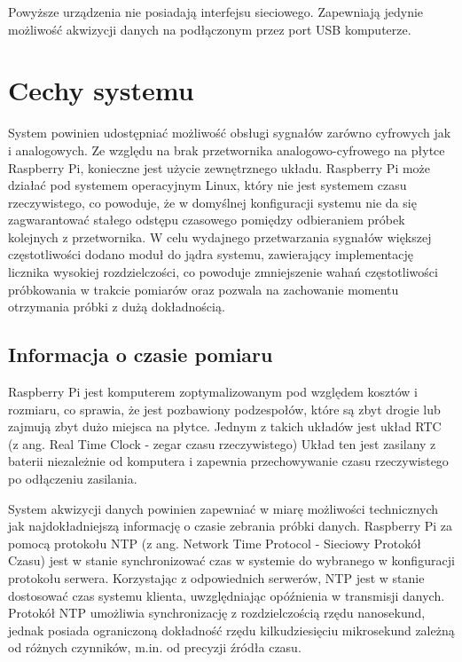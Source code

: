 Powyższe urządzenia nie posiadają interfejsu sieciowego. Zapewniają jedynie możliwość akwizycji danych na podłączonym przez port USB komputerze.

\section{Cechy systemu}
System powinien udostępniać możliwość obsługi sygnałów zarówno cyfrowych jak i analogowych. Ze względu na brak przetwornika analogowo-cyfrowego na płytce Raspberry Pi, konieczne jest użycie zewnętrznego układu.
Raspberry Pi może działać pod systemem operacyjnym Linux, który nie jest systemem czasu rzeczywistego, co powoduje, że w domyślnej konfiguracji systemu nie da się zagwarantować stałego odstępu czasowego pomiędzy odbieraniem próbek kolejnych z przetwornika. W celu wydajnego przetwarzania sygnałów większej częstotliwości dodano moduł do jądra systemu, zawierający implementację licznika wysokiej rozdzielczości, co powoduje zmniejszenie wahań częstotliwości próbkowania w trakcie pomiarów oraz pozwala na zachowanie momentu otrzymania próbki z dużą dokładnością.

\subsection{Informacja o czasie pomiaru}
\label{ntpSubsection}

Raspberry Pi jest komputerem zoptymalizowanym pod względem kosztów i rozmiaru, co sprawia, że jest pozbawiony podzespołów, które są zbyt drogie lub zajmują zbyt dużo miejsca na płytce. Jednym z takich układów jest układ RTC (z ang. Real Time Clock - zegar czasu rzeczywistego) Układ ten jest zasilany z baterii niezależnie od komputera i zapewnia przechowywanie czasu rzeczywistego po odłączeniu zasilania. 

System akwizycji danych powinien zapewniać w miarę możliwości technicznych jak najdokładniejszą informację o czasie zebrania próbki danych.
Raspberry Pi za pomocą protokołu NTP (z ang. Network Time Protocol - Sieciowy Protokół Czasu) jest w stanie synchronizować czas w systemie do wybranego w konfiguracji protokołu serwera. Korzystając z odpowiednich serwerów, NTP jest w stanie dostosować czas systemu klienta, uwzględniając opóźnienia w transmisji danych. 
Protokół NTP umożliwia synchronizację z rozdzielczością rzędu nanosekund, jednak posiada ograniczoną dokładność rzędu kilkudziesięciu mikrosekund zależną od różnych czynników, m.in. od precyzji źródła czasu. 

